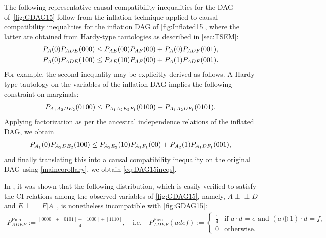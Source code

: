 \documentclass[aps,english,superscriptaddress,onecolumn,twoside,longbibliography,pra,floatfix,fleqn,nofootinbib]{revtex4-1}%
\theoremstyle{definition}
\newcommand{\p}[2][]{{P_{#1}}\parenths{#2}}
\newcommand{\indep}{\perp\!\!\!\!\perp} %
\DeclarePairedDelimiter{\parenths}{\lparen}{\rparen}
\begin{document}
The following representative causal compatibility inequalities for the DAG of~\cref{fig:GDAG15} follow from the inflation technique applied to causal compatibility inequalities for the inflation DAG of \cref{fig:Inflated15}, where the latter are obtained from Hardy-type tautologies as described in \cref{sec:TSEM}:
\begin{align}
\p[A]{0} \p[A D E]{0 0 0} \leq {\p[A E]{0 0} \p[A F]{0 0}  + \p[A]{0} \p[A D F]{0 0 1}}, \\
\p[A]{0}\p[A D E]{1 0 0} \leq {\p[A E]{1 0} \p[A F]{0 0} + \p[A]{1} \p[A D F]{0 0 1}}.
\label{eq:DAG15ineqs}
\end{align}
For example, the second inequality may be explicitly derived as follows. A Hardy-type tautology on the variables of the inflation DAG implies the following constraint on marginals:
\begin{align}\label{eq:hardyforpienaar}
     \p[A_1 A_2 D E_2]{0100} \leq \p[A_1 A_2 E_2 F_1]{0100} + \p[A_1 A_2 D F_1]{0101} .
\end{align}
Applying factorization as per the ancestral independence relations of the inflated DAG, we obtain 
\begin{align}
 \p[A_1]{0} \p[A_2 D E_2]{100} \leq \p[A_2 E_2]{10} \p[A_1 F_1]{00} + \p[A_2]{1} \p[A_1 D F_1]{001},   
\end{align}
and finally translating this into a causal compatibility inequality on the original DAG using \cref{maincorollary}, we obtain \cref{eq:DAG15ineqs}. 
 
In \citet{pianaar2016interesting}, it was shown that the following distribution, which is easily verified to satisfy the CI relations among the observed variables of \cref{fig:GDAG15}, namely, $A\indep D$ and $E\indep F | A$~\cite{pusey2014gdag}, is nonetheless incompatible with \cref{fig:GDAG15}:
\begin{align}\label{eq:pienaardistro}
	P^{\text{Pien}}_{A D E F}:=\frac{[0000]+[0101]+[1000]+[1110]}{4},\quad\text{i.e.}\quad P^{\text{Pien}}_{A D E F}(a d e f):=\begin{cases}\tfrac{1}{4}&\text{if }  a\cdot d = e \text{ and }  (a \oplus 1)\cdot d = f, \\ 0&\text{otherwise}.\end{cases}
\end{align}
\end{document}
